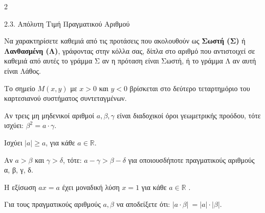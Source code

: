 \begin{ylh}{2}
    \item 2.3. Απόλυτη Τιμή Πραγματικού Αριθμού
\end{ylh}
Να χαρακτηρίσετε καθεμιά από τις προτάσεις που ακολουθούν ως \textbf{Σωστή (Σ)} ή \textbf{Λανθασμένη (Λ)}, γράφοντας στην κόλλα σας, δίπλα στο αριθμό που αντιστοιχεί σε καθεμιά από αυτές το γράμμα Σ αν η πρόταση είναι Σωστή, ή το γράμμα Λ αν αυτή είναι Λάθος.
\begin{alist}
\item
  Το σημείο $M(x,y)$ με $x > 0$ και $y < 0$ βρίσκεται στο δεύτερο τεταρτημόριο του καρτεσιανού συστήματος συντεταγμένων.
\item
  Αν τρεις μη μηδενικοί αριθμοί $a,\beta,\gamma$ είναι διαδοχικοί όροι γεωμετρικής προόδου, τότε ισχύει: $\beta^{2} = a \cdot \gamma$.
\item
  Ισχύει $|a| \geq a$, για κάθε $a \in \mathbb{R}$.
\item
  Αν $a > \beta$ και $\gamma > \delta$, τότε: $a - \gamma > \beta - \delta$ για οποιουσδήποτε πραγματικούς αριθμούς α, β, γ, δ.
\item
  Η εξίσωση $a x = a$ έχει μοναδική λύση $x = 1$ για κάθε $a\mathbb{\in R}$ .
\item Για τους πραγματικούς αριθμούς $a,\beta$ να αποδείξετε ότι: $|a \cdot \beta|\  = |a| \cdot |\beta|$.
\end{alist}

